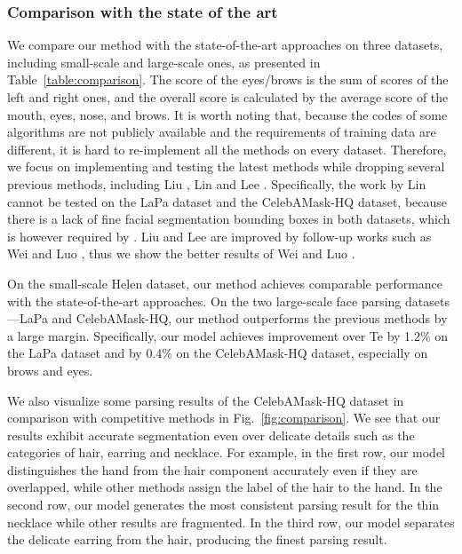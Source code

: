 \subsubsection{Comparison with the state of the art}

We compare our method with the state-of-the-art approaches on three datasets, including small-scale and large-scale ones, as presented in Table~\ref{table:comparison}. 
The score of the eyes/brows is the sum of scores of the left and right ones, and the overall score is calculated by the average score of the mouth, eyes, nose, and brows.
It is worth noting that, because the codes of some algorithms are not publicly available and the requirements of training data are different, it is hard to re-implement all the methods on every dataset. Therefore, we focus on implementing and testing the latest methods while dropping several previous methods, including Liu \et \cite{liu2017face},  Lin \et \cite{lin2019face} and Lee \et \cite{CelebAMask-HQ}. 
Specifically, the work by Lin \et \cite{lin2019face} cannot be tested on the LaPa dataset and the CelebAMask-HQ dataset, because there is a lack of fine facial segmentation bounding boxes in both datasets, which is however required by \cite{lin2019face}. Liu \et \cite{liu2017face} and Lee \et \cite{CelebAMask-HQ} are improved by follow-up works such as Wei \et \cite{wei2019accurate} and Luo \et \cite{luo2020ehanet}, thus we show the better results of Wei \et \cite{wei2019accurate} and Luo \et \cite{luo2020ehanet}.


On the small-scale Helen dataset, our method achieves comparable performance with the state-of-the-art approaches. 
On the two large-scale face parsing datasets---LaPa and CelebAMask-HQ, our method outperforms the previous methods by a large margin. 
Specifically, our model achieves improvement over Te \et \cite{te2020edge} by 1.2\% on the LaPa dataset and by 0.4\% on the CelebAMask-HQ dataset, especially on brows and eyes. 

We also visualize some parsing results of the CelebAMask-HQ dataset in comparison with competitive methods in Fig.~\ref{fig:comparison}. 
We see that our results exhibit accurate segmentation even over delicate details such as the categories of hair, earring and necklace. For example, in the first row, our model distinguishes the hand from the hair component accurately even if they are overlapped, while other methods assign the label of the hair to the hand. 
In the second row, our model generates the most consistent parsing result for the thin necklace while other results are fragmented. 
In the third row, our model separates the delicate earring from the hair, producing the finest parsing result. 


